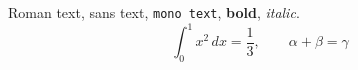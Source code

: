 \documentclass{article}
\begin{document}
Roman text, \textsf{sans text}, \texttt{mono text}, \textbf{bold}, \textit{italic}.
\[ \int_0^1 x^2\,dx = \frac13,\qquad \alpha+\beta=\gamma \]
\end{document}
